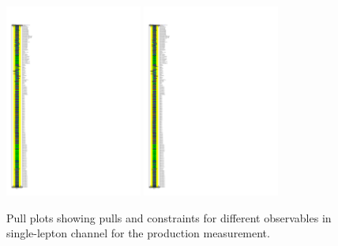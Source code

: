 \begin{figure}[ht]
  \centering
  \includegraphics[width=0.40\textwidth, viewport=0 375 150 750, clip]{figures/diff_xsec/ljet_tty_prod_mu_blinded/compare_NP_pulls/compare_NP_dilep_fits_drphb_drlj_dr/NuisPar_comp.pdf}%
  \includegraphics[width=0.40\textwidth, viewport=0 0 150 375, clip]{figures/diff_xsec/ljet_tty_prod_mu_blinded/compare_NP_pulls/compare_NP_dilep_fits_drphb_drlj_dr/NuisPar_comp.pdf}%
  \caption{Pull plots showing pulls and constraints for different observables in single-lepton channel for the \tty production measurement.}
  \label{fig:pull_plot_pt_tty_dec_free_ljet_mu_blinded}

\end{figure}


